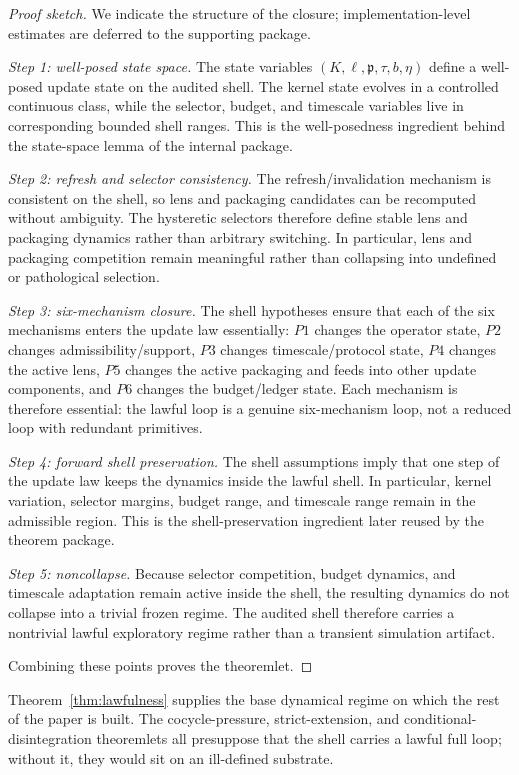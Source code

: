 \begin{proof}[Proof sketch]
We indicate the structure of the closure; implementation-level estimates are deferred to the supporting package.

\smallskip
\noindent\emph{Step 1: well-posed state space.}
The state variables \((K,\ell,\mathfrak{p},\tau,b,\eta)\) define a well-posed update state on the audited shell. The kernel state evolves in a controlled continuous class, while the selector, budget, and timescale variables live in corresponding bounded shell ranges. This is the well-posedness ingredient behind the state-space lemma of the internal package.

\smallskip
\noindent\emph{Step 2: refresh and selector consistency.}
The refresh/invalidation mechanism is consistent on the shell, so lens and packaging candidates can be recomputed without ambiguity. The hysteretic selectors therefore define stable lens and packaging dynamics rather than arbitrary switching. In particular, lens and packaging competition remain meaningful rather than collapsing into undefined or pathological selection.

\smallskip
\noindent\emph{Step 3: six-mechanism closure.}
The shell hypotheses ensure that each of the six mechanisms enters the update law essentially:
\(P1\) changes the operator state,
\(P2\) changes admissibility/support,
\(P3\) changes timescale/protocol state,
\(P4\) changes the active lens,
\(P5\) changes the active packaging and feeds into other update components,
and \(P6\) changes the budget/ledger state.
Each mechanism is therefore essential: the lawful loop is a genuine six-mechanism loop, not a reduced loop with redundant primitives.

\smallskip
\noindent\emph{Step 4: forward shell preservation.}
The shell assumptions imply that one step of the update law keeps the dynamics inside the lawful shell. In particular, kernel variation, selector margins, budget range, and timescale range remain in the admissible region. This is the shell-preservation ingredient later reused by the theorem package.

\smallskip
\noindent\emph{Step 5: noncollapse.}
Because selector competition, budget dynamics, and timescale adaptation remain active inside the shell, the resulting dynamics do not collapse into a trivial frozen regime. The audited shell therefore carries a nontrivial lawful exploratory regime rather than a transient simulation artifact.

Combining these points proves the theoremlet.
\end{proof}




Theorem~\ref{thm:lawfulness} supplies the base dynamical regime on which the rest of the paper is built. The cocycle-pressure, strict-extension, and conditional-disintegration theoremlets all presuppose that the shell carries a lawful full loop; without it, they would sit on an ill-defined substrate.
